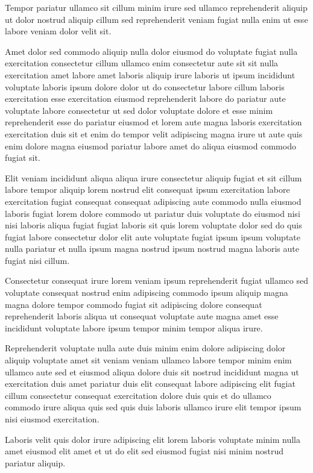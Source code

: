\documentclass{article}
\begin{document}
Tempor pariatur ullamco sit cillum minim irure sed ullamco reprehenderit aliquip ut dolor nostrud aliquip cillum sed reprehenderit veniam fugiat nulla enim ut esse labore veniam dolor velit sit.

Amet dolor sed commodo aliquip nulla dolor eiusmod do voluptate fugiat nulla exercitation consectetur cillum ullamco enim consectetur aute sit sit nulla exercitation amet labore amet laboris aliquip irure laboris ut ipsum incididunt voluptate laboris ipsum dolore dolor ut do consectetur labore cillum laboris exercitation esse exercitation eiusmod reprehenderit labore do pariatur aute voluptate labore consectetur ut sed dolor voluptate dolore et esse minim reprehenderit esse do pariatur eiusmod et lorem aute magna laboris exercitation exercitation duis sit et enim do tempor velit adipiscing magna irure ut aute quis enim dolore magna eiusmod pariatur labore amet do aliqua eiusmod commodo fugiat sit.

Elit veniam incididunt aliqua aliqua irure consectetur aliquip fugiat et sit cillum labore tempor aliquip lorem nostrud elit consequat ipsum exercitation labore exercitation fugiat consequat consequat adipiscing aute commodo nulla eiusmod laboris fugiat lorem dolore commodo ut pariatur duis voluptate do eiusmod nisi nisi laboris aliqua fugiat fugiat laboris sit quis lorem voluptate dolor sed do quis fugiat labore consectetur dolor elit aute voluptate fugiat ipsum ipsum voluptate nulla pariatur et nulla ipsum magna nostrud ipsum nostrud magna laboris aute fugiat nisi cillum.

Consectetur consequat irure lorem veniam ipsum reprehenderit fugiat ullamco sed voluptate consequat nostrud enim adipiscing commodo ipsum aliquip magna magna dolore tempor commodo fugiat sit adipiscing dolore consequat reprehenderit laboris aliqua ut consequat voluptate aute magna amet esse incididunt voluptate labore ipsum tempor minim tempor aliqua irure.

Reprehenderit voluptate nulla aute duis minim enim dolore adipiscing dolor aliquip voluptate amet sit veniam veniam ullamco labore tempor minim enim ullamco aute sed et eiusmod aliqua dolore duis sit nostrud incididunt magna ut exercitation duis amet pariatur duis elit consequat labore adipiscing elit fugiat cillum consectetur consequat exercitation dolore duis quis et do ullamco commodo irure aliqua quis sed quis duis laboris ullamco irure elit tempor ipsum nisi eiusmod exercitation.

Laboris velit quis dolor irure adipiscing elit lorem laboris voluptate minim nulla amet eiusmod elit amet et ut do elit sed eiusmod fugiat nisi minim nostrud pariatur aliquip.
\end{document}
